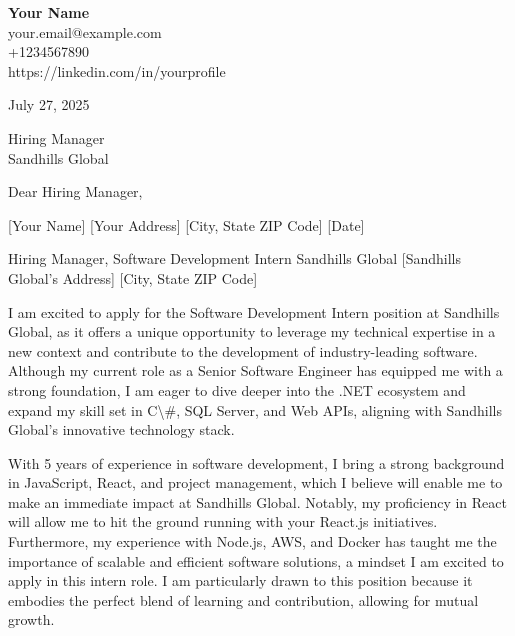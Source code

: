 \documentclass[letterpaper,11pt]{article}
\begin{document}
\begin{flushleft}
\textbf{\large Your Name} \\
your.email@example.com \\
+1234567890 \\
https://linkedin.com/in/yourprofile
\end{flushleft}

\vspace{0.5in}

July 27, 2025

\vspace{0.25in}

Hiring Manager \\
Sandhills Global \\

\vspace{0.25in}

Dear Hiring Manager,

\vspace{0.1in}

[Your Name]  
[Your Address]  
[City, State ZIP Code]  
[Date]

Hiring Manager, Software Development Intern  
Sandhills Global  
[Sandhills Global's Address]  
[City, State ZIP Code]

I am excited to apply for the Software Development Intern position at Sandhills Global, as it offers a unique opportunity to leverage my technical expertise in a new context and contribute to the development of industry-leading software. Although my current role as a Senior Software Engineer has equipped me with a strong foundation, I am eager to dive deeper into the .NET ecosystem and expand my skill set in C\textbackslash{}#, SQL Server, and Web APIs, aligning with Sandhills Global's innovative technology stack.

With 5 years of experience in software development, I bring a strong background in JavaScript, React, and project management, which I believe will enable me to make an immediate impact at Sandhills Global. Notably, my proficiency in React will allow me to hit the ground running with your React.js initiatives. Furthermore, my experience with Node.js, AWS, and Docker has taught me the importance of scalable and efficient software solutions, a mindset I am excited to apply in this intern role. I am particularly drawn to this position because it embodies the perfect blend of learning and contribution, allowing for mutual growth.
\end{document}
